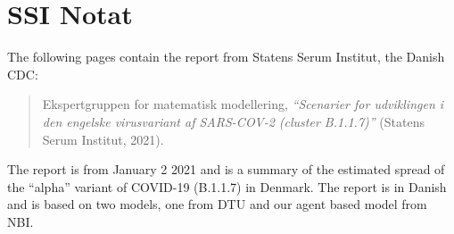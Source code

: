 \clearpage
% 




\chapter{SSI Notat}
\label{appendix:ssi-notat}

The following pages contain the report from Statens Serum Institut, the Danish CDC:
\begin{quote}
    Ekspertgruppen for matematisk modellering, \emph{``Scenarier for udviklingen i den engelske virusvariant af SARS-COV-2 (cluster B.1.1.7)''} (Statens Serum Institut, 2021).
\end{quote}
The report is from January 2 2021 and is a summary of the estimated spread of the ``alpha'' variant of COVID-19 (B.1.1.7) in Denmark. The report is in Danish and is based on two models, one from DTU and our agent based model from NBI.

\clearpage



